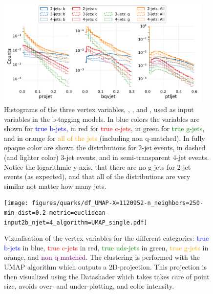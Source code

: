 \documentclass[a4paper, twoside, nobib]{tufte-book}
\newcommand{\code}[1]{\colorbox{light-gray}{\texttt{\detokenize{#1}}}}
\begin{document}
\begin{figure}
  \includegraphics[width=0.95\textwidth, trim=0 0 0 0, clip]{figures/quarks/btagging_variables_hist-down_sample=1.00-ML_vars=vertex-selection=b-ejet_min=4-n_iter_RS_lgb=99-n_iter_RS_xgb=9-cdot_cut=0.90-version=19.pdf}
  \caption[Histograms of the vertex variables]
          {Histograms of the three vertex variables, \code{projet}, \code{bqvjet}, and \code{ptljet}, used as input variables in the b-tagging models. In blue colors the variables are shown for \textcolor{blue}{true b-jets}, in red for \textcolor{red}{true c-jets}, in green for \textcolor{green}{true g-jets}, and in orange for \textcolor{orange}{all of the jets} (including non q-matched). In fully opaque color are shown the distributions for 2-jet events, in dashed (and lighter color) 3-jet events, and in semi-transparent 4-jet events. Notice the logarithmic y-axis, that there are no g-jets for 2-jet events (as expected), and that all of the distributions are very similar not matter how many jets.
          } 
  \label{fig:q:vertex_variables}
\end{figure}



\begin{figure}
  \texttt{[image: figures/quarks/df\_UMAP-X=1120952-n\_neighbors=250-min\_dist=0.2-metric=euclidean-input2b\_njet=4\_algorithm=UMAP\_single.pdf]}
  \caption[UMAP vizualisation of vertex variables]
          {Vizualisation of the vertex variables for the different categories: \textcolor{blue}{true b-jets} in blue, \textcolor{red}{true c-jets} in red, \textcolor{green}{true uds-jets} in green, \textcolor{orange}{true g-jets} in orange, and \textcolor{purple}{non q-matched}. The clustering is performed with the UMAP algorithm which outputs a 2D-projection. This projection is then visualized using the Datashader which takes takes care of point size, avoids over- and under-plotting, and color intensity. 
          } 
  \label{fig:q:UMAP_vertex}
\end{figure}
\end{document}
